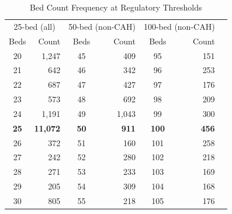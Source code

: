 \begin{table}[t]
\centering
\caption{Bed Count Frequency at Regulatory Thresholds}
\label{tab:frequency}
\begin{tabular}{crcrcrr}
\hline\hline
\multicolumn{2}{c}{25-bed (all)} & \multicolumn{2}{c}{50-bed (non-CAH)} & \multicolumn{2}{c}{100-bed (non-CAH)} \\
Beds & Count & Beds & Count & Beds & Count \\
\hline
20 & 1,247 & 45 & 409 & 95 & 151 \\
21 & 642 & 46 & 342 & 96 & 253 \\
22 & 687 & 47 & 427 & 97 & 176 \\
23 & 573 & 48 & 692 & 98 & 209 \\
24 & 1,191 & 49 & 1,043 & 99 & 300 \\
\textbf{25} & \textbf{11,072} & \textbf{50} & \textbf{911} & \textbf{100} & \textbf{456} \\
26 & 372 & 51 & 160 & 101 & 258 \\
27 & 242 & 52 & 280 & 102 & 218 \\
28 & 271 & 53 & 233 & 103 & 169 \\
29 & 205 & 54 & 309 & 104 & 168 \\
30 & 805 & 55 & 218 & 105 & 176 \\
\hline\hline
\end{tabular}
\par{}
\end{table}

